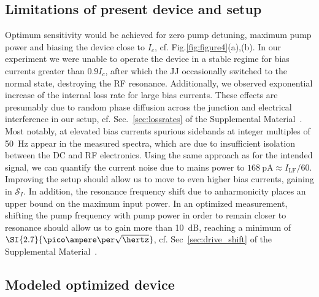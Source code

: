 \subsection{Limitations of present device and setup}\label{subsec:limitations}
% 
Optimum sensitivity would be achieved for zero pump detuning, maximum pump power and biasing the device close to $I_c$, cf. Fig.\ref{fig:figure4}(a),(b).
% 
In our experiment we were unable to operate the device in a stable regime for bias currents greater than $0.9 I_c$, after which the JJ occasionally switched to the normal state, destroying the RF resonance.
% 
Additionally, we observed exponential increase of the internal loss rate for large bias currents.
% 
These effects are presumably due to random phase diffusion across the junction and electrical interference in our setup, cf. Sec.~\ref{sec:lossrates} of the Supplemental Material~\cite{SeeSupplementalMaterial}.
% 
Most notably, at elevated bias currents spurious sidebands at integer multiples of \SI{50}{\hertz} appear in the measured spectra, which are due to insufficient isolation between the DC and RF electronics.
% 
Using the same approach as for the intended signal, we can quantify the current noise due to mains power to $\SI{168}{\pico\ampere}\approx I_\text{LF}/60$.
% 
Improving the setup should allow us to move to even higher bias currents, gaining in $\mathcal{S}_I$.
% 
In addition, the resonance frequency shift due to anharmonicity places an upper bound on the maximum input power.
% 
In an optimized measurement, shifting the pump frequency with pump power in order to remain closer to resonance should allow us to gain more than \SI{10}{dB}, reaching a minimum of $\SI{2.7}{\pico\ampere\per\sqrt{\hertz}}$, cf. Sec~\ref{sec:drive_shift} of the Supplemental Material~\cite{SeeSupplementalMaterial}.

\subsection{Modeled optimized device}

